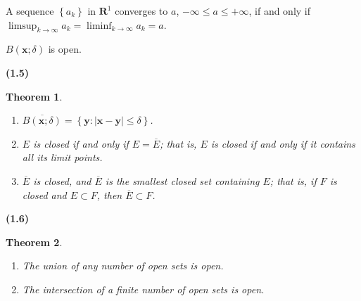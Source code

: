 \documentclass[12pt]{book}
\newcommand{\st}{\bf{:}}
\newcommand{\set}[1]{\left\{ #1 \right\}}
\newcommand{\ee}{\end{enumerate}}
\newcommand{\x}{\mathbf{x}}
\newcommand{\y}{\mathbf{y}}
\newcommand{\R}{\mathbf{R}}
\renewcommand{\.}{\mkern1mu}
\newcommand{\abs}[1]{\left| #1 \right|}
\theoremstyle{theorem}
\newtheorem{theorem}{Theorem}
\newcommand{\thmindent}{\setlength{\parindent}{17pt}}
\newenvironment{thm}[1]
	{\noindent \textbf{#1}\hspace{2ex}\begin{minipage}[t]{\linewidth - \widthof{\textbf{(#1)}}}  \begin{theorem}\thmindent }
	{\end{theorem}\end{minipage}\medskip}
\renewcommand{\bf}[1]{\boldsymbol{#1}}
\begin{document}
	\item A sequence $\set{a_k}$ in $\R^1$ converges to $a$, $-\infty \leq a \leq +\infty$, if and only if $\limsup_{k\to\infty} a_k  = \liminf_{k\to\infty}a_k = a$.
	\item $B(\x;\delta)$ is open.
	\item 
		\begin{thm}{(1.5)}\hfill
			\begin{enumerate}[label = \textnormal{\bfseries (\roman*)}]
				\item $\overline{B(\x;\delta)} = \set{\y \st \abs{\x - \y} \leq \delta}$.
				\item $E$ is closed if and only if $E = \overline E$; that is, $E$ is closed if and only if it contains all its limit points.
				\item $\overline E$ is closed, and $\overline E$ is the smallest closed set containing $E$; that is, if $F$ is closed and $E \subset F$, then $\overline E \subset F$.
			\ee
		\end{thm}
	\item 
		\begin{thm}{(1.6)}\hfill
			\begin{enumerate}[label = \textnormal{\bfseries (\roman*)}]
				\item The union of any number of open sets is open.
				\item The intersection of a finite number of open sets is open.
			\ee
		\end{thm}
		
\end{document}
